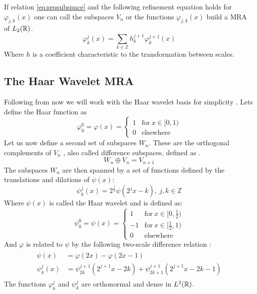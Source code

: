 \documentclass[../master_thesis.tex]{subfiles}
\begin{document}
If relation \ref{eq:seqsubspace} and the following refinement equation holds for $\varphi_{j,k}(x)$
one can call the subspaces $V_n$ or the functions $\varphi_{j,k}(x)$ build a \ac{MRA} of $L_2(\mathbb{R})$.
\begin{equation}
\varphi^j_k(x) = \sum_{k\in\mathbb{Z}} h^{j+1}_k\varphi^{j+1}_k(x)
\end{equation}
Where $h$ is a coefficient characteristic to the transformation between scales.
\subsection{The Haar Wavelet \ac{MRA}}
Following from now we will work with the Haar wavelet basis for simplicity \cite{Beylkin:MRA}.
Lets define the Haar function \cite{Schneider:2007} as
\begin{equation}
  \varphi^0_0 = \varphi(x) =
  \begin{cases}
  1 & \text{for} \ x\in [0,1)\\
  0 & \text{elsewhere}
\end{cases}
\end{equation}
Let us now define a second set of subspaces $W_n$. These are the orthogonal complements of $V_n$ \cite{Alpert1993}, also called difference subspaces,
defined as \cite{Beylkin:MRA, Sorland, Alpert1993}.
\begin{equation}
  W_n \oplus V_n = V_{n + 1} \label{eq:diffsubspace}
\end{equation}
The subspaces $W_n$ are then spanned by a set of functions defined by the translations and
dilations of $\psi(x)$:
\begin{equation}
  \psi_k^j(x) = 2^{\frac{j}{2}}\psi(2^jx - k),\  j,k \in \mathbb{Z} \label{eq:haarwavelet}
\end{equation}
Where $\psi(x)$ is called the Haar wavelet \cite{Schneider:2007} and is defined as:
\begin{equation}
  \psi^0_0 = \psi(x) =
  \begin{cases}
  1 & \text{for} \ x\in [0,\frac{1}{2})\\
  -1 & \text{for}\ x\in [\frac{1}{2}, 1)\\
  0 & \text{elsewhere}
\end{cases}
\end{equation}
And $ \varphi$ is related to $\psi$ by the following two-scale difference relation \cite{Beylkin:MRA, Schneider:2007, Sorland}:
\begin{align}
  \begin{split}\label{eq:2scalewavelet}
    \psi(x) &= \varphi(2x) - \varphi(2x - 1)\\
    \psi^j_k(x) &= \psi^{j+1}_{2k}(2^{j+1}x - 2k) + \psi^{j+1}_{2k+1}(2^{j+1}x - 2k - 1)
  \end{split}
\end{align}
The functions $\varphi^j_k$ and $\psi^j_k$ are orthonormal
and dense \cite{Beylkin:MRA, Sorland, SRJensen:2014} in $L^2(\mathbb{R})$.
\end{document}
